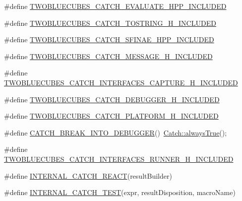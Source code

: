 \begin{DoxyCompactItemize}
\item 
\#define \hyperlink{a00094_a5182533b90ae6028b4003ee34ea3c317}{T\+W\+O\+B\+L\+U\+E\+C\+U\+B\+E\+S\+\_\+\+C\+A\+T\+C\+H\+\_\+\+E\+V\+A\+L\+U\+A\+T\+E\+\_\+\+H\+P\+P\+\_\+\+I\+N\+C\+L\+U\+D\+E\+D}
\item 
\#define \hyperlink{a00094_ac25416dc686629ad60493262cc42c451}{T\+W\+O\+B\+L\+U\+E\+C\+U\+B\+E\+S\+\_\+\+C\+A\+T\+C\+H\+\_\+\+T\+O\+S\+T\+R\+I\+N\+G\+\_\+\+H\+\_\+\+I\+N\+C\+L\+U\+D\+E\+D}
\item 
\#define \hyperlink{a00094_a5b7548a20bcce22bb178bad3c80c4f7d}{T\+W\+O\+B\+L\+U\+E\+C\+U\+B\+E\+S\+\_\+\+C\+A\+T\+C\+H\+\_\+\+S\+F\+I\+N\+A\+E\+\_\+\+H\+P\+P\+\_\+\+I\+N\+C\+L\+U\+D\+E\+D}
\item 
\#define \hyperlink{a00094_a0e15a2d360f827455b6ef757290ada34}{T\+W\+O\+B\+L\+U\+E\+C\+U\+B\+E\+S\+\_\+\+C\+A\+T\+C\+H\+\_\+\+M\+E\+S\+S\+A\+G\+E\+\_\+\+H\+\_\+\+I\+N\+C\+L\+U\+D\+E\+D}
\item 
\#define \hyperlink{a00094_a465bc09c8d9805aad7642381df6cae5f}{T\+W\+O\+B\+L\+U\+E\+C\+U\+B\+E\+S\+\_\+\+C\+A\+T\+C\+H\+\_\+\+I\+N\+T\+E\+R\+F\+A\+C\+E\+S\+\_\+\+C\+A\+P\+T\+U\+R\+E\+\_\+\+H\+\_\+\+I\+N\+C\+L\+U\+D\+E\+D}
\item 
\#define \hyperlink{a00094_ad762c0f54e0f59a5d1e1326ca378a0ff}{T\+W\+O\+B\+L\+U\+E\+C\+U\+B\+E\+S\+\_\+\+C\+A\+T\+C\+H\+\_\+\+D\+E\+B\+U\+G\+G\+E\+R\+\_\+\+H\+\_\+\+I\+N\+C\+L\+U\+D\+E\+D}
\item 
\#define \hyperlink{a00094_aaf8c6350ab325682f46e786bfef3b622}{T\+W\+O\+B\+L\+U\+E\+C\+U\+B\+E\+S\+\_\+\+C\+A\+T\+C\+H\+\_\+\+P\+L\+A\+T\+F\+O\+R\+M\+\_\+\+H\+\_\+\+I\+N\+C\+L\+U\+D\+E\+D}
\item 
\#define \hyperlink{a00094_a89636e916d8b61c85c63ea5a75b1e6fd}{C\+A\+T\+C\+H\+\_\+\+B\+R\+E\+A\+K\+\_\+\+I\+N\+T\+O\+\_\+\+D\+E\+B\+U\+G\+G\+E\+R}()~\hyperlink{a00117_a129be2186a2f6546206ec52c4bf2156f}{Catch\+::always\+True}();
\item 
\#define \hyperlink{a00094_a8a69d5371df35756eb6ad9b47bcf3e94}{T\+W\+O\+B\+L\+U\+E\+C\+U\+B\+E\+S\+\_\+\+C\+A\+T\+C\+H\+\_\+\+I\+N\+T\+E\+R\+F\+A\+C\+E\+S\+\_\+\+R\+U\+N\+N\+E\+R\+\_\+\+H\+\_\+\+I\+N\+C\+L\+U\+D\+E\+D}
\item 
\#define \hyperlink{a00094_a345ec5265fc806d64c3dda4c184e8071}{I\+N\+T\+E\+R\+N\+A\+L\+\_\+\+C\+A\+T\+C\+H\+\_\+\+R\+E\+A\+C\+T}(result\+Builder)
\item 
\#define \hyperlink{a00094_abd733b3fcbeffd2ca83afaeecc838972}{I\+N\+T\+E\+R\+N\+A\+L\+\_\+\+C\+A\+T\+C\+H\+\_\+\+T\+E\+S\+T}(expr,  result\+Disposition,  macro\+Name)

\end{DoxyCompactItemize}
